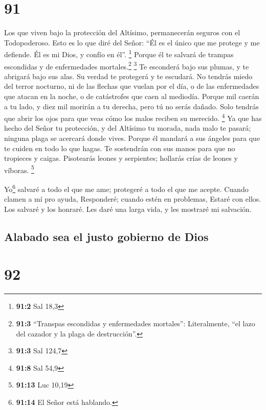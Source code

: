 \hypertarget{section-90}{%
\section{91}\label{section-90}}

 Los que viven bajo la protección del Altísimo,
permanecerán seguros con el Todopoderoso.  Esto es lo que
diré del Señor: ``Él es el único que me protege y me defiende. Él es mi
Dios, y confío en él''. \footnote{\textbf{91:2} Sal 18,3} 
Porque él te salvará de trampas escondidas y de enfermedades
mortales.\footnote{\textbf{91:3} ``Transpas escondidas y enfermedades
  mortales'': Literalmente, ``el lazo del cazador y la plaga de
  destrucción''.} \footnote{\textbf{91:3} Sal 124,7}  Te
esconderá bajo sus plumas, y te abrigará bajo sus alas. Su verdad te
protegerá y te escudará.  No tendrás miedo del terror
nocturno, ni de las flechas que vuelan por el día,  o de
las enfermedades que atacan en la noche, o de catástrofes que caen al
mediodía.  Porque mil caerán a tu lado, y diez mil morirán
a tu derecha, pero tú no serás dañado.  Solo tendrás que
abrir los ojos para que veas cómo los malos reciben su merecido.
\footnote{\textbf{91:8} Sal 54,9}  Ya que has hecho del
Señor tu protección, y del Altísimo tu morada,  nada malo
te pasará; ninguna plaga se acercará donde vives.  Porque
él mandará a sus ángeles para que te cuiden en todo lo que hagas.
 Te sostendrán con sus manos para que no tropieces y
caigas.  Pisotearás leones y serpientes; hollarás crías
de leones y víboras. \footnote{\textbf{91:13} Luc 10,19}

 Yo\footnote{\textbf{91:14} El Señor está hablando.}
salvaré a todo el que me ame; protegeré a todo el que me acepte.
 Cuando clamen a mí pro ayuda, Responderé; cuando estén
en problemas, Estaré con ellos. Los salvaré y los honraré.
 Les daré una larga vida, y les mostraré mi salvación.

\hypertarget{alabado-sea-el-justo-gobierno-de-dios}{%
\subsection{Alabado sea el justo gobierno de
Dios}\label{alabado-sea-el-justo-gobierno-de-dios}}

\hypertarget{section-91}{%
\section{92}\label{section-91}}

